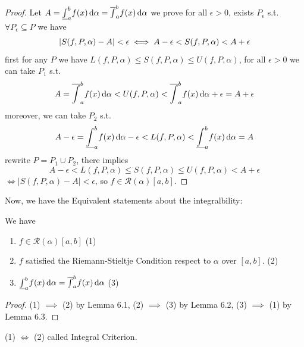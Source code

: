 \documentclass[
	UTF-8,
	11pt, %
	a4paper, %
]{LegrandOrangeBook}
\begin{document}
    \begin{proof}
        Let $A = \underline{\int}_{a}^{b}f(x) \, \mathrm{d} \alpha = \overline{\int}_{a}^{b}f(x) \, \mathrm{d} \alpha$ we prove 
        for all $\epsilon >0$, exists $P_\epsilon$ s.t. $\forall P_\epsilon \subseteq P$ we have 
        $$
                \left| S(f,P,\alpha) -A \right| < \epsilon \\
            \iff  A - \epsilon < S(f,P,\alpha)  < A + \epsilon
        $$
        first for any $P$ we have $ L(f,P,\alpha) \leq  S(f,P,\alpha) \leq  U(f,P,\alpha)$, 
        for all $\epsilon >0$ we can take $P_1$ s.t.
        $$
            A = \overline{\int}_{a}^{b}f(x) \, \mathrm{d} \alpha < U(f,P,\alpha) 
            < \overline{\int}_{a}^{b}f(x) \, \mathrm{d} \alpha + \epsilon = A + \epsilon
        $$
        moreover, we can take $P_2$ s.t.
        $$
            A - \epsilon = \underline{\int}_{a}^{b}f(x) \, \mathrm{d} \alpha - \epsilon < L(f,P,\alpha) 
            < \underline{\int}_{a}^{b}f(x) \, \mathrm{d} \alpha = A 
        $$
        rewrite $P = P_1 \cup P_2$, there implies 
        $$
            A - \epsilon < L(f,P,\alpha) \leq  S(f,P,\alpha) \leq  U(f,P,\alpha) < A + \epsilon
        $$
        $\iff \left| S(f,P,\alpha) -A \right| < \epsilon$, so $f\in \mathcal{R}(\alpha)[a,b]$.

    \end{proof}

    \newpage

    Now, we have the Equivalent statements about the integralbility:

    \begin{corollary} We have
        \begin{enumerate}
            \item[] $f \in \mathcal{R}(\alpha)[a,b]$ \hfill (1)
            \item[$\iff$] $f$ satisfied the Riemann-Stieltje Condition respect to $\alpha$ over $[a,b]$. \hfill (2)
            \item[$\iff$] $\underline{\int}_{a}^{b}f(x) \, \mathrm{d} \alpha = \overline{\int}_{a}^{b}f(x) \, \mathrm{d} \alpha$ \hfill (3)
        \end{enumerate}
    \end{corollary}

    \begin{proof}
        (1) $ \implies$ (2) by Lemma 6.1, 
        (2) $ \implies$ (3) by Lemma 6.2, 
        (3) $ \implies$ (1) by Lemma 6.3.
    \end{proof}

    \begin{remark}
        (1) $\iff$ (2) called Integral Criterion.
    \end{remark}
\end{document}
